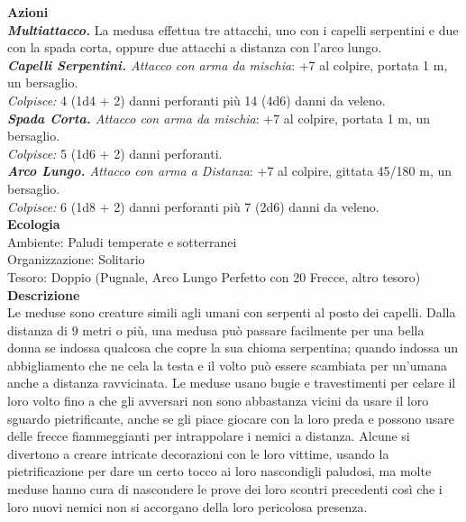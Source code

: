 \begin{multicols}{2}
\smallskip\textbf{Azioni}\\

\emph{\textbf{Multiattacco.}} La medusa effettua tre attacchi, uno con i capelli serpentini e due con la spada corta, oppure due attacchi a distanza con l'arco lungo.\\
\emph{\textbf{Capelli Serpentini.} Attacco con arma da mischia}: +7 al colpire, portata 1 m, un bersaglio.\\
\emph{Colpisce:} 4 (1d4 + 2) danni perforanti più 14 (4d6) danni da veleno.\\
\emph{\textbf{Spada Corta.} Attacco con arma da mischia}: +7 al colpire, portata 1 m, un bersaglio.\\
\emph{Colpisce:} 5 (1d6 + 2) danni perforanti.\\
\emph{\textbf{Arco Lungo.} Attacco con arma a Distanza}: +7 al colpire, gittata 45/180 m, un bersaglio.\\
\emph{Colpisce:} 6 (1d8 + 2) danni perforanti più 7 (2d6) danni da veleno.\\
\textbf{Ecologia}\\
Ambiente: Paludi temperate e sotterranei\\
Organizzazione: Solitario\\
Tesoro: Doppio (Pugnale, Arco Lungo Perfetto con 20 Frecce, altro tesoro)\\
\textbf{Descrizione}\\
Le meduse sono creature simili agli umani con serpenti al posto dei capelli. Dalla distanza di 9 metri o più, una medusa può passare facilmente per una bella donna se indossa qualcosa che copre la sua chioma serpentina; quando indossa un abbigliamento che ne cela la testa e il volto può essere scambiata per un'umana anche a distanza ravvicinata. Le meduse usano bugie e travestimenti per celare il loro volto fino a che gli avversari non sono abbastanza vicini da usare il loro sguardo pietrificante, anche se gli piace giocare con la loro preda e possono usare delle frecce fiammeggianti per intrappolare i nemici a distanza. Alcune si divertono a creare intricate decorazioni con le loro vittime, usando la pietrificazione per dare un certo tocco ai loro nascondigli paludosi, ma molte meduse hanno cura di nascondere le prove dei loro scontri precedenti così che i loro nuovi nemici non si accorgano della loro pericolosa presenza.\\


\end{multicols}
